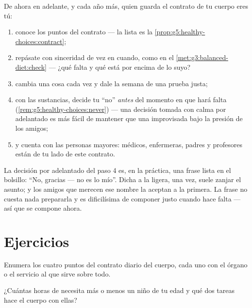 \begin{method}\label{met:g5:healthy-choices:run}
De ahora en adelante, y cada año más, quien guarda el contrato de tu
cuerpo eres tú:
\begin{enumerate}
  \item conoce los puntos del contrato --- la lista es la
        \cref{prop:g5:healthy-choices:contract};
  \item repásate con sinceridad de vez en cuando, como en el
        \cref{met:g3:balanced-diet:check} --- ¿qué falta y qué está
        por encima de lo suyo?
  \item cambia una cosa cada vez y dale la semana de una prueba justa;
  \item con las sustancias, decide tu ``no'' \emph{antes} del momento
        en que hará falta (\cref{rem:g5:healthy-choices:never}) ---
        una decisión tomada con calma por adelantado es más fácil de
        mantener que una improvisada bajo la presión de los amigos;
  \item y cuenta con las personas mayores: médicos, enfermeras, padres
        y profesores están de tu lado de este contrato.
\end{enumerate}
\end{method}

\begin{example}\label{ex:g5:healthy-choices:answers}
La decisión por adelantado del paso 4 es, en la práctica, una frase
lista en el bolsillo: ``No, gracias --- no es lo mío''. Dicha a la
ligera, una vez, suele zanjar el asunto; y los amigos que merecen ese
nombre la aceptan a la primera. La frase no cuesta nada prepararla y
es dificilísima de componer justo cuando hace falta --- así que se
compone ahora.
\end{example}

\section{Ejercicios}

\begin{exercise}[$\star$]\label{exo:g5:healthy-choices:1}
Enumera los cuatro puntos del contrato diario del cuerpo, cada uno con
el órgano o el servicio al que sirve sobre todo.
\end{exercise}

\begin{exercise}[$\star$]\label{exo:g5:healthy-choices:2}
¿Cuántas horas de  necesita más o menos un niño de tu edad y qué
dos tareas hace el cuerpo con ellas?
\end{exercise}

